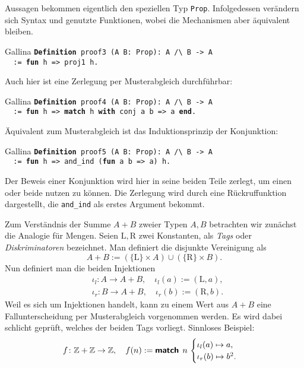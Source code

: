 \documentclass[8pt]{beamer}
\newcommand{\strong}[1]{\textsf{\textbf{#1}}}
\newcommand{\Z}{\mathbb Z}
\newcommand{\kw}[1]{\textbf{#1}}
\begin{document}
\begin{frame}
Aussagen bekommen eigentlich den speziellen Typ \texttt{Prop}.
Infolgedessen verändern sich Syntax und genutzte Funktionen,
wobei die Mechanismen aber äquivalent bleiben.
\begin{block}{Gallina}
\texttt{\kw{Definition} proof3 (A B: Prop): A /{\textbackslash} B -> A\\
\ \ := \kw{fun} h => proj1 h.}
\end{block}\pause
Auch hier ist eine Zerlegung per Musterabgleich durchführbar:
\begin{block}{Gallina}
\texttt{\kw{Definition} proof4 (A B: Prop): A /{\textbackslash} B -> A\\
\ \ := \kw{fun} h => \kw{match} h \kw{with} conj a b => a \kw{end}.}
\end{block}\pause
Äquivalent zum Musterabgleich ist das Induktionsprinzip der Konjunktion:
\begin{block}{Gallina}
\texttt{\kw{Definition} proof5 (A B: Prop): A /{\textbackslash} B -> A\\
\ \ := \kw{fun} h => and\_ind (\kw{fun} a b => a) h.}
\end{block}
Der Beweis einer Konjunktion wird hier in seine beiden Teile zerlegt,
um einen oder beide nutzen zu können. Die Zerlegung wird durch eine
Rückruffunktion dargestellt, die \texttt{and\_ind} als erstes Argument
bekommt.
\end{frame}

\begin{frame}
Zum Verständnis der Summe $A+B$ zweier Typen $A,B$ betrachten wir
zunächst die Analogie für Mengen. Seien $\mathrm L,\mathrm R$
zwei Konstanten, als \emph{Tags} oder \emph{Diskriminatoren} bezeichnet.
Man definiert die disjunkte Vereinigung als
\[A+B := (\{\mathrm L\}\times A)\cup (\{\mathrm R\}\times B).\]\pause
Nun definiert man die beiden Injektionen
\begin{align*}
&\iota_l\colon A\to A+B,\quad\iota_l(a) := (\mathrm L, a),\\
&\iota_r\colon B\to A+B,\quad\iota_r(b) := (\mathrm R, b).
\end{align*}
Weil es sich um Injektionen handelt, kann zu einem Wert aus $A+B$
eine Fallunterscheidung per Musterabgleich vorgenommen werden.
Es wird dabei schlicht geprüft, welches der beiden Tags vorliegt.\pause{}
Sinnloses Beispiel:
\[f\colon\Z+\Z\to\Z,\quad f(n) := \strong{match}\;\,n\,\begin{cases}
\iota_l(a)\mapsto a,\\
\iota_r(b)\mapsto b^2.
\end{cases}\]
\end{frame}
\end{document}
